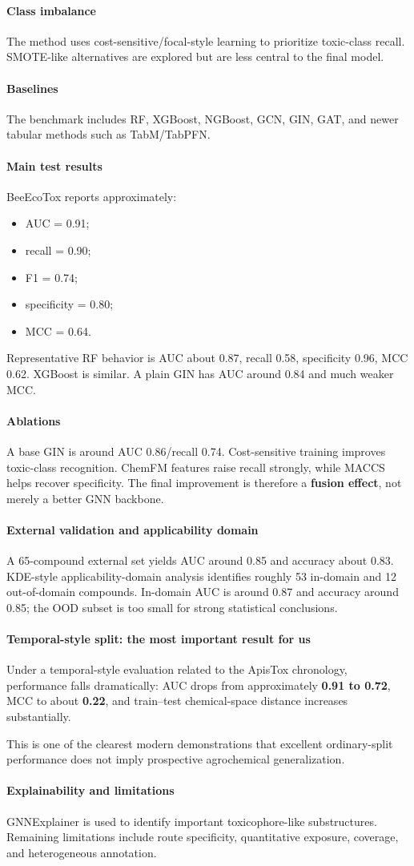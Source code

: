 \documentclass[11pt]{article}
\newcommand{\reviewfield}[2]{\paragraph{#1}#2}
\begin{document}
\reviewfield{Class imbalance}{
The method uses cost-sensitive/focal-style learning to prioritize toxic-class recall. SMOTE-like alternatives are explored but are less central to the final model.
}

\reviewfield{Baselines}{
The benchmark includes RF, XGBoost, NGBoost, GCN, GIN, GAT, and newer tabular methods such as TabM/TabPFN.
}

\reviewfield{Main test results}{
BeeEcoTox reports approximately:
\begin{itemize}
    \item AUC = 0.91;
    \item recall = 0.90;
    \item F1 = 0.74;
    \item specificity = 0.80;
    \item MCC = 0.64.
\end{itemize}
Representative RF behavior is AUC about 0.87, recall 0.58, specificity 0.96, MCC 0.62. XGBoost is similar. A plain GIN has AUC around 0.84 and much weaker MCC.
}

\reviewfield{Ablations}{
A base GIN is around AUC 0.86/recall 0.74. Cost-sensitive training improves toxic-class recognition. ChemFM features raise recall strongly, while MACCS helps recover specificity. The final improvement is therefore a \textbf{fusion effect}, not merely a better GNN backbone.
}

\reviewfield{External validation and applicability domain}{
A 65-compound external set yields AUC around 0.85 and accuracy about 0.83. KDE-style applicability-domain analysis identifies roughly 53 in-domain and 12 out-of-domain compounds. In-domain AUC is around 0.87 and accuracy around 0.85; the OOD subset is too small for strong statistical conclusions.
}

\reviewfield{Temporal-style split: the most important result for us}{
Under a temporal-style evaluation related to the ApisTox chronology, performance falls dramatically: AUC drops from approximately \textbf{0.91 to 0.72}, MCC to about \textbf{0.22}, and train--test chemical-space distance increases substantially.

This is one of the clearest modern demonstrations that excellent ordinary-split performance does not imply prospective agrochemical generalization.
}

\reviewfield{Explainability and limitations}{
GNNExplainer is used to identify important toxicophore-like substructures. Remaining limitations include route specificity, quantitative exposure, coverage, and heterogeneous annotation.
}
\end{document}
